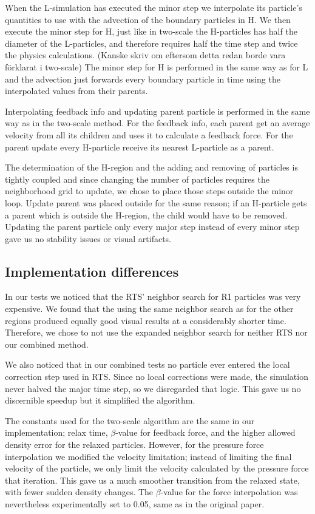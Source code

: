 \documentclass[../../main.tex]{subfiles}
\begin{document}
When the L-simulation has executed the minor step we interpolate its particle's quantities to use with the advection of the boundary particles in H. We then execute the minor step for H, just like in two-scale the H-particles has half the diameter of the L-particles, and therefore requires half the time step and twice the physics calculations. (Kanske skriv om eftersom detta redan borde vara förklarat i two-scale) The minor step for H is performed in the same way as for L and the advection just forwards every boundary particle in time using the interpolated values from their parents. 

Interpolating feedback info and updating parent particle is performed in the same way as in the two-scale method. For the feedback info, each parent get an average velocity from all its children and uses it to calculate a feedback force. For the parent update every H-particle receive its nearest L-particle as a parent. 

The determination of the H-region and the adding and removing of particles is tightly coupled and since changing the number of particles requires the neighborhood grid to update, we chose to place those steps outside the minor loop. Update parent was placed outside for the same reason; if an H-particle gets a parent which is outside the H-region, the child would have to be removed. Updating the parent particle only every major step instead of every minor step gave us no stability issues or visual artifacts. 


\subsection{Implementation differences}
In our tests we noticed that the RTS' neighbor search for R1 particles was very expensive. We found that the using the same neighbor search as for the other regions produced equally good visual results at a considerably shorter time. Therefore, we chose to not use the expanded neighbor search for neither RTS nor our combined method. 

We also noticed that in our combined tests no particle ever entered the local correction step used in RTS. Since no local corrections were made, the simulation never halved the major time step, so we disregarded that logic. This gave us no discernible speedup but it simplified the algorithm. 

The constants used for the two-scale algorithm are the same in our implementation; relax time, $\beta$-value for feedback force, and the higher allowed density error for the relaxed particles. However, for the pressure force interpolation we modified the velocity limitation; instead of limiting the final velocity of the particle, we only limit the velocity calculated by the pressure force that iteration. This gave us a much smoother transition from the relaxed state, with fewer sudden density changes. The $\beta$-value for the force interpolation was nevertheless experimentally set to 0.05, same as in the original paper. 
\end{document}
